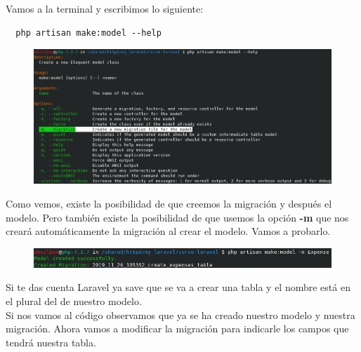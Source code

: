 \documentclass{article}
\begin{document}
Vamos a la terminal y escribimos lo siguiente:

\begin{verbatim}
  php artisan make:model --help
\end{verbatim}

\begin{figure}[h!]
  \centering
  \includegraphics[scale=0.6]{./Pictures/102_make_model_migration.png}
\end{figure}

Como vemos, existe la posibilidad de que creemos la migración y después el
modelo. Pero también existe la posibilidad de que usemos la opción \textbf{-m}
que nos creará automáticamente la migración al crear el modelo. Vamos a
probarlo.\\

\begin{figure}[h!]
  \centering
  \includegraphics[scale=0.75]{./Pictures/103_expense_model_m.png}
\end{figure}

Si te das cuenta Laravel ya save que se va a crear una tabla y el nombre está
en el plural del de nuestro modelo.\\

Si nos vamos al código observamos que ya se ha creado nuestro modelo y nuestra
migración. Ahora vamos a modificar la migración para indicarle los campos que
tendrá nuestra tabla.\\
\end{document}
